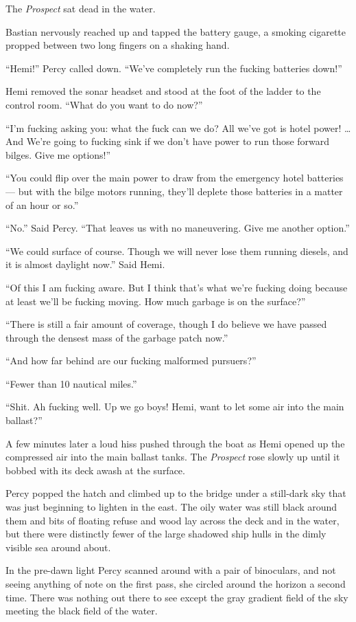 \documentclass[
]{scrbook}
\begin{document}
The \emph{Prospect} sat dead in the water.

Bastian nervously reached up and tapped the battery gauge, a smoking
cigarette propped between two long fingers on a shaking hand.

``Hemi!'' Percy called down. ``We've completely run the fucking
batteries down!''

Hemi removed the sonar headset and stood at the foot of the ladder to
the control room. ``What do you want to do now?''

``I'm fucking asking you: what the fuck can we do? All we've got is
hotel power! \ldots And We're going to fucking sink if we don't have
power to run those forward bilges. Give me options!''

``You could flip over the main power to draw from the emergency hotel
batteries --- but with the bilge motors running, they'll deplete those
batteries in a matter of an hour or so.''

``No.'' Said Percy. ``That leaves us with no maneuvering. Give me
another option.''

``We could surface of course. Though we will never lose them running
diesels, and it is almost daylight now.'' Said Hemi.

``Of this I am fucking aware. But I think that's what we're fucking
doing because at least we'll be fucking moving. How much garbage is on
the surface?''

``There is still a fair amount of coverage, though I do believe we have
passed through the densest mass of the garbage patch now.''

``And how far behind are our fucking malformed pursuers?''

``Fewer than 10 nautical miles.''

``Shit. Ah fucking well. Up we go boys! Hemi, want to let some air into
the main ballast?''

A few minutes later a loud hiss pushed through the boat as Hemi opened
up the compressed air into the main ballast tanks. The \emph{Prospect}
rose slowly up until it bobbed with its deck awash at the surface.

Percy popped the hatch and climbed up to the bridge under a still-dark
sky that was just beginning to lighten in the east. The oily water was
still black around them and bits of floating refuse and wood lay across
the deck and in the water, but there were distinctly fewer of the large
shadowed ship hulls in the dimly visible sea around about.

In the pre-dawn light Percy scanned around with a pair of binoculars,
and not seeing anything of note on the first pass, she circled around
the horizon a second time. There was nothing out there to see except the
gray gradient field of the sky meeting the black field of the water.
\end{document}

